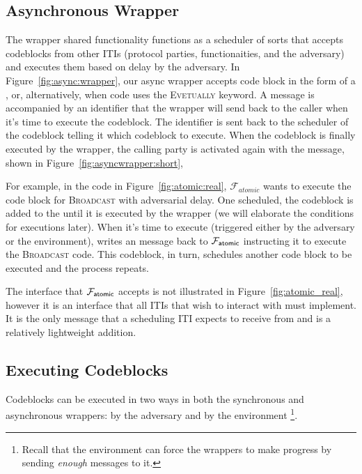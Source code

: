 
\subsection{Asynchronous Wrapper}
The wrapper shared functionality functions as a scheduler of sorts that accepts codeblocks from other ITIs (protocol parties, functionaities, and the adversary) and executes them based on delay by the adversary.
In Figure~\ref{fig:async:wrapper}, our async wrapper accepts code block in the form of a , or, alternatively, when code uses the \textsc{Evetually} keyword.
A  message is accompanied by an identifier that the wrapper will send back to the caller when it's time to execute the codeblock.
The identifier is sent back to the scheduler of the codeblock telling it which codeblock to execute.
When the codeblock is finally executed by the wrapper, the calling party is activated again with the \Exec message, shown in Figure~\ref{fig:asyncwrapper:short}, 	 	

For example, in the code in Figure~\ref{fig:atomic:real}, $\mathcal{F}_{atomic}$ wants to execute the code block for \textsc{Broadcast} with adversarial delay. 
One scheduled, the codeblock is added to the  until it is executed by the wrapper (we will elaborate the conditions for executions later).
When it's time to execute (triggered either by the adversary or the environment), \Wasync writes an \Exec message back to $\mathcal{F}_{{\mathsf {atomic}}}$ instructing it to execute the \textsc{Broadcast} code.
This codeblock, in turn, schedules another code block to be executed and the process repeats.

The \Exec interface that $\mathcal{F}_{{\mathsf {atomic}}}$ accepts is not illustrated in Figure~\ref{fig:atomic_real}, however it is an interface that all ITIs that wish to interact with \Wasync must implement.
It is the only message that a scheduling ITI expects to receive from \Wasync and is a relatively lightweight addition. 

\subsection{Executing Codeblocks}
Codeblocks can be executed in two ways in both the synchronous and asynchronous wrappers: by the adversary and by the environment \footnote{Recall that the environment can force the wrappers to make progress by sending {\em enough} \Advance messages to it.}.





